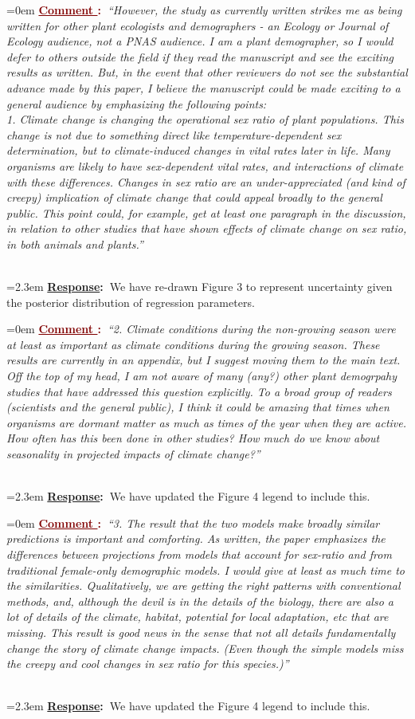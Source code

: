 \documentclass[12pt]{article}
\newcounter{cN}
\newcommand{\comment}[1]{
	\vspace{2em}
	\refstepcounter{cN} %
	\noindent \hangindent=0em \textbf{\textcolor{Maroon}{\uline{Comment \thecN}:~}}\emph{``#1''}
	}
\newcommand{\response}[1]{
	\\[0.25em]
	\hangindent=2.3em \textbf{\textcolor{NavyBlue}{\uline{Response}:~}}#1
	}
\begin{document}
\comment{However, the study as currently written strikes me as being written for other plant ecologists and demographers - an Ecology or Journal of Ecology audience, not a PNAS audience. I am a plant demographer, so I would defer to others outside the field if they read the manuscript and see the exciting results as written. But, in the event that other reviewers do not see the substantial advance made by this paper, I believe the manuscript could be made exciting to a general audience by emphasizing the following points:
\\
1. Climate change is changing the operational sex ratio of plant populations. This change is not due to something direct like temperature-dependent sex determination, but to climate-induced changes in vital rates later in life. Many organisms are likely to have sex-dependent vital rates, and interactions of climate with these differences. Changes in sex ratio are an under-appreciated (and kind of creepy) implication of climate change that could appeal broadly to the general public. This point could, for example, get at least one paragraph in the discussion, in relation to other studies that have shown effects of climate change on sex ratio, in both animals and plants.}
\response{We have re-drawn Figure 3 to represent uncertainty given the posterior distribution of regression parameters.}

\comment{2. Climate conditions during the non-growing season were at least as important as climate conditions during the growing season. These results are currently in an appendix, but I suggest moving them to the main text. Off the top of my head, I am not aware of many (any?) other plant demogrpahy studies that have addressed this question explicitly. To a broad group of readers (scientists and the general public), I think it could be amazing that times when organisms are dormant matter as much as times of the year when they are active. How often has this been done in other studies? How much do we know about seasonality in projected impacts of climate change?}
\response{We have updated the Figure 4 legend to include this.}

\comment{3. The result that the two models make broadly similar predictions is important and comforting. As written, the paper emphasizes the differences between projections from models that account for sex-ratio and from traditional female-only demographic models. I would give at least as much time to the similarities. Qualitatively, we are getting the right patterns with conventional methods, and, although the devil is in the details of the biology, there are also a lot of details of the climate, habitat, potential for local adaptation, etc that are missing. This result is good news in the sense that not all details fundamentally change the story of climate change impacts. (Even though the simple models miss the creepy and cool changes in sex ratio for this species.)}
\response{We have updated the Figure 4 legend to include this.}
\end{document}
